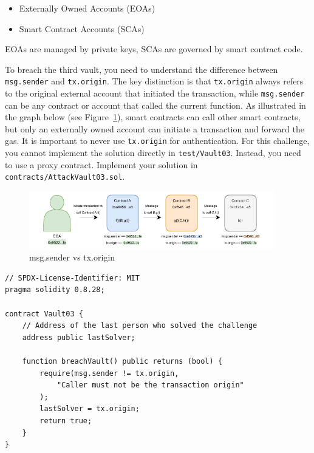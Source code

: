 \documentclass[12pt]{article}
\begin{document}
\begin{itemize}
    \item Externally Owned Accounts (EOAs)
    \item Smart Contract Accounts (SCAs)
\end{itemize}
EOAs are managed by private keys, SCAs are governed by smart contract code.

\noindent
To breach the third vault, you need to understand the difference between \texttt{msg.sender} and \texttt{tx.origin}. The key distinction is that \texttt{tx.origin} always refers to the original external account that initiated the transaction, while \texttt{msg.sender} can be any contract or account that called the current function. As illustrated in the graph below (see Figure~\ref{fig:msg.sender}), smart contracts can call other smart contracts, but only an externally owned account can initiate a transaction and forward the gas. It is important to never use \texttt{tx.origin} for authentication. For this challenge, you cannot implement the solution directly in \texttt{test/Vault03}. Instead, you need to use a proxy contract. Implement your solution in \texttt{contracts/AttackVault03.sol}.

\begin{figure}[h!]
    \centering
    \includegraphics[width=0.95\textwidth]{msg.sender.pdf}
    \caption{msg.sender vs tx.origin}
    \label{fig:msg.sender}
\end{figure}

\noindent
\begin{minipage}{\textwidth}
    \begin{lstlisting}[language=Solidity]
// SPDX-License-Identifier: MIT
pragma solidity 0.8.28;

contract Vault03 {
    // Address of the last person who solved the challenge
    address public lastSolver;

    function breachVault() public returns (bool) {
        require(msg.sender != tx.origin,
            "Caller must not be the transaction origin"
        );
        lastSolver = tx.origin;
        return true;
    }
}
\end{lstlisting}
\end{minipage}
\end{document}
